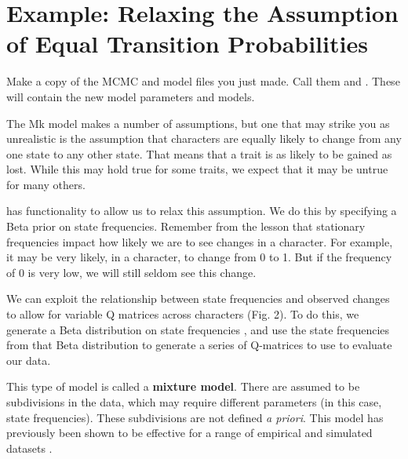 \section{Example: Relaxing the Assumption of Equal Transition Probabilities }\label{sec:dm_disc}


{\begin{framed}
Make a copy of the MCMC and model files you just made. 
Call them  and . 
These will contain the new model parameters and models. \par 
\end{framed}}
\begin{figure}[h!]
\label{fig:module-gm}
\end{figure}
The Mk model makes a number of assumptions, but one that may strike you as unrealistic is the assumption that characters are equally likely to change from any one state to any other state.
That means that a trait is as likely to be gained as lost.
While this may hold true for some traits, we expect that it may be untrue for many others. \par
{} has functionality to allow us to relax this assumption.
We do this by specifying a Beta prior on state frequencies.
Remember from the  lesson that stationary frequencies impact how likely we are to see changes in a character.
For example, it may be very likely, in a character, to change from 0 to 1.
But if the frequency of 0 is very low, we will still seldom see this change. \par
We can exploit the relationship between state frequencies and observed changes to allow for variable Q matrices across characters (Fig. 2).
To do this, we generate a Beta distribution on state frequencies \citep{huelsenbeck01c}, and use the state frequencies from that Beta distribution to generate a series of Q-matrices to use to evaluate our data. \par
This type of model is called a \textbf{mixture model}.
There are assumed to be subdivisions in the data, which may require different parameters (in this case, state frequencies).
These subdivisions are not defined \textit{a priori}. 
This model has previously been shown to be effective for a range of empirical and simulated datasets \citep{wright16}.\par




